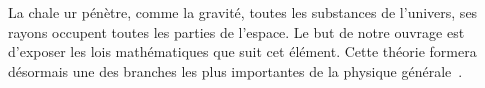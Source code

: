 \documentclass[subscriptcorrection,upint,varvw,mathalfa=cal=euler,barcolor=black,balance,hyphenate,french,pdf-a,nolists]{asmejour}
\begin{document}
La chale ur pénètre, comme la gravité, toutes les substances de l'univers, ses rayons occupent toutes les parties de l'espace. Le but de notre ouvrage est d'exposer les lois mathématiques que suit cet élé­ment. Cette théorie formera désormais une des branches les plus importantes de la physique gé­nérale~\cite{fourier1822}.








\end{document}
